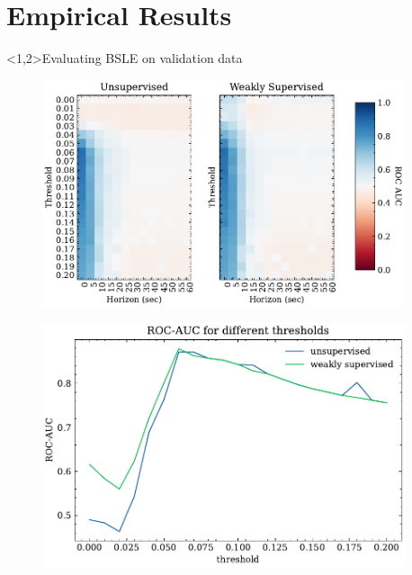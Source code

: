 \documentclass[t]{beamer}
\theoremstyle{definition}
\begin{document}
\section{Empirical Results}
\begin{frame}<1,2>{Evaluating BSLE on validation data}
     {
    \begin{figure}
        \centering
        \includegraphics[width=0.95\textwidth]{figs/auc_roc_scores_for_thresholds_and_horizons_sec.pdf}
        \label{fig:my_label}
    \end{figure}
    }
     {
    \begin{figure}
        \centering
        \includegraphics[width=0.95\textwidth]{figs/roc_auc_score_for_thresholds.pdf}
        \label{fig:my_label}
    \end{figure}
    }
     {
    \begin{columns}


\end{columns}}
\end{frame}
\end{document}
